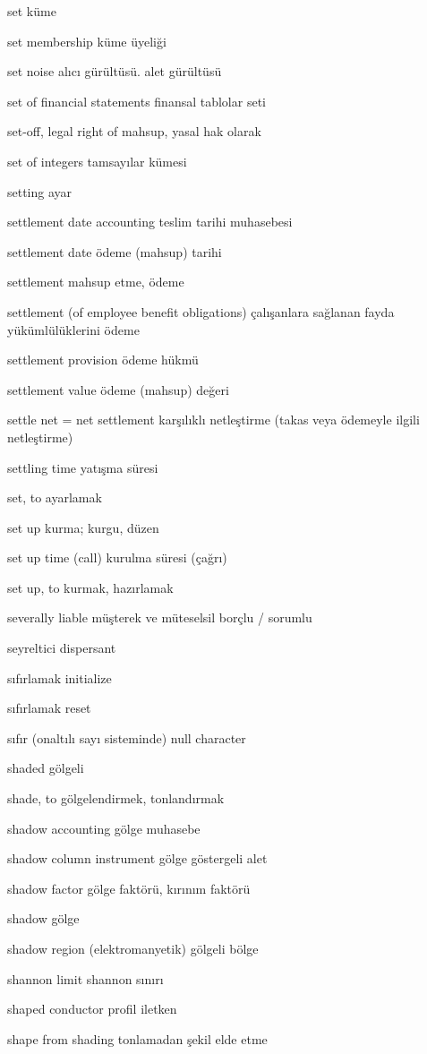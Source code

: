 \documentclass[12pt,fleqn]{article}\usepackage{../../common}
\begin{document}
set küme

set membership küme üyeliği

set noise alıcı gürültüsü. alet gürültüsü

set of financial statements finansal tablolar seti

set-off, legal right of mahsup, yasal hak olarak

set of integers tamsayılar kümesi

setting ayar

settlement date accounting teslim tarihi muhasebesi

settlement date ödeme (mahsup) tarihi

settlement mahsup etme, ödeme

settlement (of employee benefit obligations) çalışanlara sağlanan fayda yükümlülüklerini ödeme

settlement provision ödeme hükmü

settlement value ödeme (mahsup) değeri

settle net = net settlement karşılıklı netleştirme (takas veya ödemeyle ilgili netleştirme)

settling time yatışma süresi

set, to ayarlamak

set up kurma; kurgu, düzen

set up time (call) kurulma süresi (çağrı)

set up, to kurmak, hazırlamak

severally liable müşterek ve müteselsil borçlu / sorumlu

seyreltici dispersant

sıfırlamak initialize

sıfırlamak reset

sıfır (onaltılı sayı sisteminde) null character

shaded gölgeli

shade, to gölgelendirmek, tonlandırmak

shadow accounting gölge muhasebe

shadow column instrument gölge göstergeli alet

shadow factor gölge faktörü, kırınım faktörü

shadow gölge

shadow region (elektromanyetik) gölgeli bölge

shannon limit shannon sınırı

shaped conductor profil iletken

shape from shading tonlamadan şekil elde etme
\end{document}
